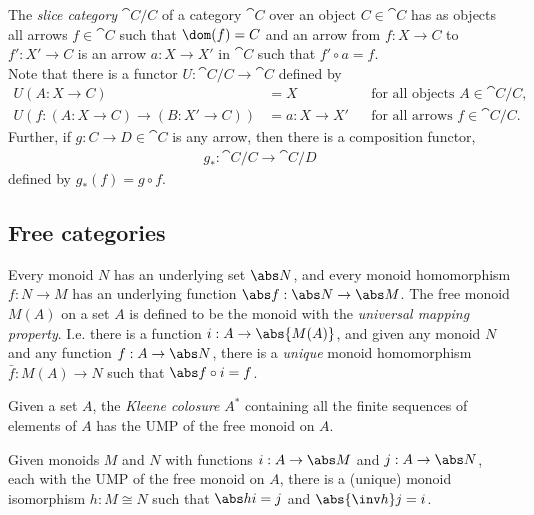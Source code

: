 \documentclass{article}
\begin{document}
\begin{definition}
    The \emph{slice category} $\cat C/C$ of a category $\cat C$ over an
    object $C\in\cat C$ has as objects all arrows $f\in\cat C$ such that
    $\dom(f)=C$ and an arrow from $f:X\to C$ to $f':X'\to C$ is an arrow
    $a:X\to X'$ in $\cat C$ such that $f'\circ a = f$.\\
    Note that there is a functor $U:\cat C/C \to \cat C$ defined by
    \begin{align*}
        U(A:X\to C) &= X 
        &&\text{for all objects }A\in\cat C/C,\\
        U(f:(A:X\to C)\to(B:X'\to C))&= a:X\to X' 
        &&\text{for all arrows }f\in\cat C/C.
    \end{align*}
    Further, if $g:C\to D\in\cat C$ is any arrow, then there is a composition
    functor,
    \begin{align*}
        g_*:\cat C/C\to\cat C/D
    \end{align*}
    defined by $g_*(f)= g\circ f$.
\end{definition}

\subsection{Free categories}

\begin{definition}[UMP of $M(A)$]
    Every monoid $N$ has an underlying set $\abs N$, and every monoid
    homomorphism $f:N\to M$ has an underlying function $\abs f: \abs N
    \to \abs M$.
    The free monoid $M(A)$ on a set $A$ is defined to be
    the monoid with the \emph{universal mapping property}. 
    I.e. there is a function $i:A\to \abs{M(A)}$, and given any
    monoid $N$ and any function $f:A\to\abs N$, there is a
    \emph{unique} monoid homomorphism $\bar f: M(A)\to N$
    such that $\abs f \circ i = f$.
\end{definition}

\begin{proposition}[Awodey 1.9]
    Given a set $A$, the \emph{Kleene colosure} $A^*$ containing 
    all the finite sequences of elements of $A$ has the UMP of the
    free monoid on $A$.
\end{proposition}

\begin{proposition}
    Given monoids $M$ and $N$ with functions $i:A\to\abs M$ and
    $j:A\to\abs N$, each with the UMP of the free monoid on $A$,
    there is a (unique) monoid isomorphism $h:M\cong N$ such that
    $\abs h i=j$ and $\abs{\inv h}j = i$.
\end{proposition}
\end{document}
